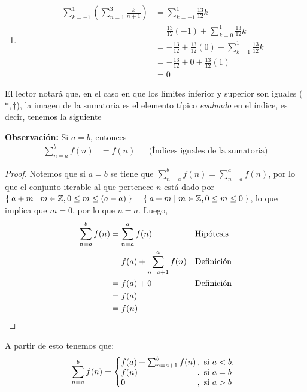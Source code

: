 \begin{enumerate}
  \item \begin{align*}
    \sum_{k=-1}^{1} \left(\sum_{n=1}^{3} \frac{k}{n+1}\right) &= \sum_{k=-1}^{1} \frac{13}{12}k\\
    &= \frac{13}{12} (-1) + \sum_{k=0}^{1} \frac{13}{12}k\\
    &= - \frac{13}{12} + \frac{13}{12} (0) + \sum_{k=1}^{1} \frac{13}{12}k\\
    &= - \frac{13}{12} + 0 + \frac{13}{12} (1)\\
    &= 0
  \end{align*}
\end{enumerate}


  El lector notará que, en el caso en que los límites inferior y superior son iguales ($*, \dag$), la imagen de la sumatoria es el elemento típico \textit{evaluado} en el índice, es decir, tenemos la siguiente

  \textbf{Observación:} Si $a=b$, entonces
  \begin{align*}
    \sum_{n=a}^{b} f(n) &= f(n) && \text{(Índices iguales de la sumatoria)}
  \end{align*}
  
  \begin{proof}\leavevmode
    Notemos que si $a=b$ se tiene que $\sum_{n=a}^{b} f(n) = \sum_{n=a}^{a} f(n)$, por lo que el conjunto iterable al que pertenece $n$ está dado por $\Set{a+m|m\in \mathbb{Z}, 0\leq m\leq (a-a)}=\Set{a+m|m\in \mathbb{Z}, 0\leq m\leq 0}$, lo que implica que $m=0$, por lo que $n=a$. Luego,
    \begin{align*}
      \sum_{n=a}^{b} f(n) &= \sum_{n=a}^{a} f(n) && \text{Hipótesis}\\
      &= f(a) + \sum_{n=a+1}^{a} f(n) && \text{Definición}\\
      &= f(a) + 0 && \text{Definición}\\
      &= f(a)\\
      &= f(n) && \qedhere
    \end{align*}
  \end{proof}

  A partir de esto tenemos que:
  \[
    \sum_{n=a}^{b} f(n) = \left\{
    \begin{array}{@{}l@{\thinspace}l}
    f(a) + \sum_{n=a+1}^{b} f(n) &,  \ \text{si}  \ a<b.\\
    f(n) &,  \ \text{si}  \ a=b\\
    0 &,  \ \text{si}  \ a>b
    \end{array} \right. \]

